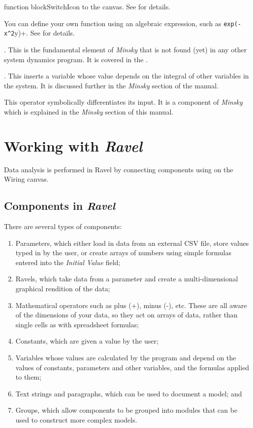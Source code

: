 \begin{description}
{function block}{SwitchIcon} to the canvas. See 
for details.
\item [{User defined function}]  You can
define your own function using an algebraic expression, such as \verb+exp(-x^2+y)+.
See for details.
\item [{Godley Table}] . \label{GodleyTable}
This is the fundamental element of \emph{Minsky} that is not found
(yet) in any other system dynamics program. It is covered in the .
\item [{Integration}] . This inserts a variable whose
value depends on the integral of other variables in the system. It
is discussed further in the \emph{Minsky} section of the manual.
\item [{Derivative Operator}]  This operator
symbolically differentiates its input. It is a component of \emph{Minsky}
which is explained in the \emph{Minsky} section of this manual.
\end{description}

\section{Working with \emph{Ravel}}

Data analysis is performed in Ravel by connecting components using
 on the Wiring canvas.

\subsection{Components in \emph{Ravel}}

There are several types of components:
\begin{enumerate}
\item Parameters, which either load in data from an external CSV file, store
values typed in by the user, or create arrays of numbers using simple
formulas entered into the \emph{Initial Value} field;
\item Ravels, which take data from a parameter and create a multi-dimensional
graphical rendition of the data; 
\item Mathematical operators such as plus (+), minus (-), etc. These are
all aware of the dimensions of your data, so they act on arrays of
data, rather than single cells as with spreadsheet formulas; 
\item Constants, which are given a value by the user;
\item Variables whose values are calculated by the program and depend on
the values of constants, parameters and other variables, and the formulas
applied to them;
\item Text strings and paragraphs, which can be used to document a model;
and
\item Groups, which allow components to be grouped into modules that can
be used to construct more complex models. 
\end{enumerate}

